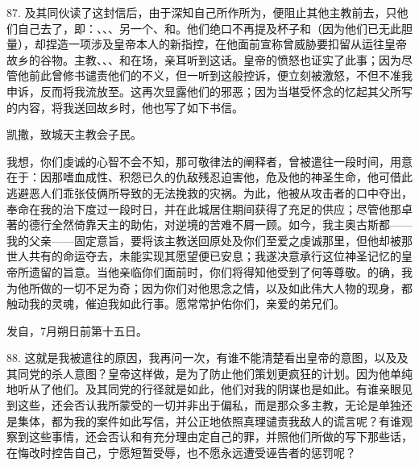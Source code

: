 87. 及其同伙读了这封信后，由于深知自己所作所为，便阻止其他主教前去，只他们自己去了，即：、、、另一个、和。他们绝口不再提及杯子和（因为他们已无此胆量），却捏造一项涉及皇帝本人的新指控，在他面前宣称曾威胁要扣留从运往皇帝故乡的谷物。主教、、、和在场，亲耳听到这话。皇帝的愤怒也证实了此事；因为尽管他前此曾修书谴责他们的不义，但一听到这般控诉，便立刻被激怒，不但不准我申诉，反而将我流放至。这再次显露他们的邪恶；因为当堪受怀念的忆起其父所写的内容，将我送回故乡时，他也写了如下书信。\par

凯撒，致城天主教会子民。\par

我想，你们虔诚的心智不会不知，那可敬律法的阐释者，曾被遣往一段时间，用意在于：因那嗜血成性、积怨已久的仇敌残忍迫害他，危及他的神圣生命，他可借此逃避恶人们乖张伎俩所导致的无法挽救的灾祸。为此，他被从攻击者的口中夺出，奉命在我的治下度过一段时日，并在此城居住期间获得了充足的供应；尽管他那卓著的德行全然倚靠天主的助佑，对逆境的苦难不屑一顾。如今，我主奥古斯都——我的父亲——固定意旨，要将该主教送回原处及你们至爱之虔诚那里，但他却被那世人共有的命运夺去，未能实现其愿望便已安息；我遂决意承行这位神圣记忆的皇帝所遗留的旨意。当他亲临你们面前时，你们将得知他受到了何等尊敬。的确，我为他所做的一切不足为奇；因为你们对他思念之情，以及如此伟大人物的现身，都触动我的灵魂，催迫我如此行事。愿常常护佑你们，亲爱的弟兄们。\par

发自，7月朔日前第十五日。\par

88. 这就是我被遣往的原因，我再问一次，有谁不能清楚看出皇帝的意图，以及及其同党的杀人意图？皇帝这样做，是为了防止他们策划更疯狂的计划。因为他单纯地听从了他们。及其同党的行径就是如此，他们对我的阴谋也是如此。有谁亲眼见到这些，还会否认我所蒙受的一切并非出于偏私，而是那众多主教，无论是单独还是集体，都为我的案件如此写信，并公正地依照真理谴责我敌人的谎言呢？有谁观察到这些事情，还会否认和有充分理由定自己的罪，并照他们所做的写下那些话，在悔改时控告自己，宁愿短暂受辱，也不愿永远遭受诬告者的惩罚呢？\par


